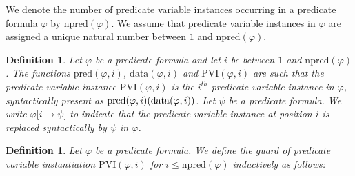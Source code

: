 \documentclass{article}
\newtheorem{definition}[theorem]{Definition}
\begin{document}
We denote the number of predicate variable instances occurring in a
predicate formula $\varphi $ by $\mathrm{npred}(\varphi )$. We assume that
predicate variable instances in $\varphi $ are assigned a unique natural
number between $1$ and $\mathrm{npred}(\varphi )$.

\begin{definition}
Let $\varphi $ be a predicate formula and let $i$ be between $1$ and $%
\mathrm{npred}(\varphi )$. The functions $\mathrm{pred}(\varphi ,i)$, $%
\mathrm{data}(\varphi ,i)$ and $\mathrm{PVI}(\varphi ,i)$ are such that the
predicate variable instance $\mathrm{PVI}(\varphi ,i)$ is the $i^{th}$
predicate variable instance in $\varphi $, syntactically present as $\mathrm{%
pred}(\varphi ,i)(\mathrm{data}(\varphi ,i))$. Let $\psi $ be a predicate
formula. We write $\varphi \lbrack i\rightarrow \psi ]$ to indicate that the
predicate variable instance at position $i$ is replaced syntactically by $%
\psi $ in $\varphi $.
\end{definition}

\begin{definition}
Let $\varphi $ be a predicate formula. We define the guard of predicate
variable instantiation $\mathrm{PVI}(\varphi ,i)$ for $i\leq \mathrm{npred}%
(\varphi )$ inductively as follows:
\end{definition}
\end{document}

